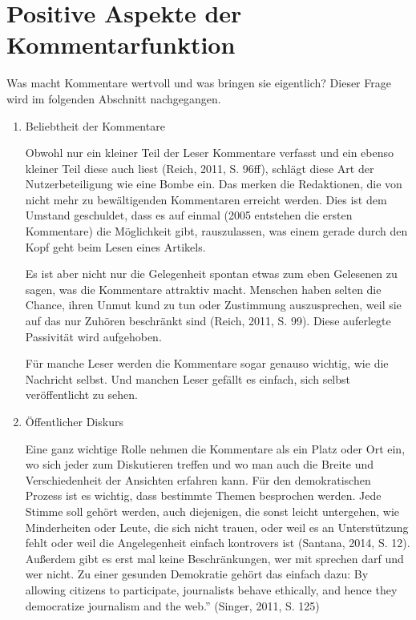 \chapter{Positive Aspekte der Kommentarfunktion}

Was macht Kommentare wertvoll und was bringen sie eigentlich? Dieser Frage wird
im folgenden Abschnitt nachgegangen.

\begin{enumerate}
\item{Beliebtheit der Kommentare}

Obwohl nur ein kleiner Teil der Leser Kommentare verfasst und ein ebenso kleiner
Teil diese auch liest (Reich, 2011, S. 96ff), schlägt diese Art der
Nutzerbeteiligung wie eine Bombe ein. Das merken die Redaktionen, die von nicht
mehr zu bewältigenden Kommentaren erreicht werden. Dies ist dem Umstand
geschuldet, dass es auf einmal (2005 entstehen die ersten Kommentare) die
Möglichkeit gibt, rauszulassen, was einem gerade durch den Kopf geht beim Lesen
eines Artikels.

Es ist aber nicht nur die Gelegenheit spontan etwas zum eben Gelesenen zu sagen,
was die Kommentare attraktiv macht. Menschen haben selten die Chance, ihren
Unmut kund zu tun oder Zustimmung auszusprechen, weil sie auf das nur Zuhören
beschränkt sind (Reich, 2011, S. 99). Diese auferlegte Passivität wird
aufgehoben.

Für manche Leser werden die Kommentare sogar genauso wichtig, wie die Nachricht
selbst. Und manchen Leser gefällt es einfach, sich selbst veröffentlicht zu
sehen.


\item{Öffentlicher Diskurs}

Eine ganz wichtige Rolle nehmen die Kommentare als ein Platz oder Ort ein, wo
sich jeder zum Diskutieren treffen und wo man auch die Breite und
Verschiedenheit der Ansichten erfahren kann. Für den demokratischen Prozess ist
es wichtig, dass bestimmte Themen besprochen werden. Jede Stimme soll gehört
werden, auch diejenigen, die sonst leicht untergehen, wie Minderheiten oder
Leute, die sich nicht trauen, oder weil es an Unterstützung fehlt oder weil die
Angelegenheit einfach kontrovers ist (Santana, 2014, S. 12). Außerdem gibt es erst mal 
keine Beschränkungen, wer mit sprechen darf und wer nicht.
Zu einer gesunden Demokratie gehört das einfach dazu: 
\glqq By allowing citizens to participate,
journalists behave ethically, and hence they democratize journalism and
the web.'' (Singer, 2011, S. 125)


\end{enumerate}
